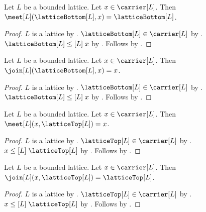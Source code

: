\begin{proposition}\label{meet_lattice_bottom}
    Let $L$ be a bounded lattice.
    Let $x\in\carrier[L]$.
    Then $\meet[L](\latticeBottom[L],x)=\latticeBottom[L]$.
\end{proposition}
\begin{proof}
    $L$ is a lattice by .
    $\latticeBottom[L]\in\carrier[L]$ by .
    $\latticeBottom[L]\mathrel{\leq[L]}x$ by
        .
    Follows by
        .
\end{proof}

\begin{proposition}\label{join_lattice_bottom}
    Let $L$ be a bounded lattice.
    Let $x\in\carrier[L]$.
    Then $\join[L](\latticeBottom[L],x)=x$.
\end{proposition}
\begin{proof}
    $L$ is a lattice by .
    $\latticeBottom[L]\in\carrier[L]$ by .
    $\latticeBottom[L]\mathrel{\leq[L]}x$ by
        .
    Follows by
        .
\end{proof}

\begin{proposition}\label{meet_lattice_top}
    Let $L$ be a bounded lattice.
    Let $x\in\carrier[L]$.
    Then $\meet[L](x,\latticeTop[L])=x$.
\end{proposition}
\begin{proof}
    $L$ is a lattice by .
    $\latticeTop[L]\in\carrier[L]$ by .
    $x\mathrel{\leq[L]}\latticeTop[L]$ by
        .
    Follows by
        .
\end{proof}

\begin{proposition}\label{join_lattice_top}
    Let $L$ be a bounded lattice.
    Let $x\in\carrier[L]$.
    Then $\join[L](x,\latticeTop[L])=\latticeTop[L]$.
\end{proposition}
\begin{proof}
    $L$ is a lattice by .
    $\latticeTop[L]\in\carrier[L]$ by .
    $x\mathrel{\leq[L]}\latticeTop[L]$ by
        .
    Follows by
        .
\end{proof}

